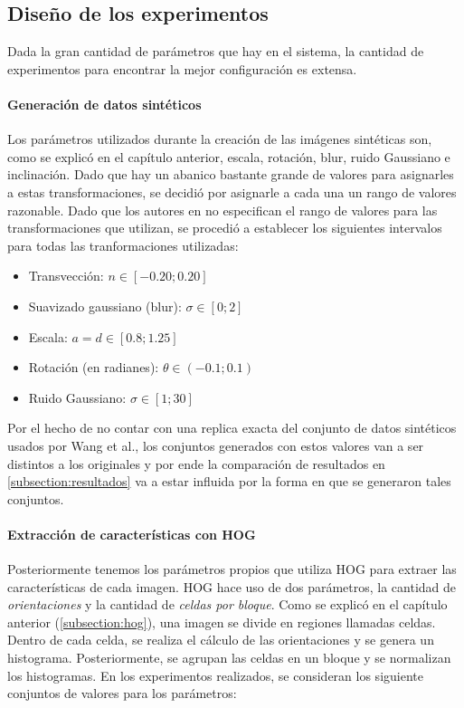 \subsection{Diseño de los experimentos}

	Dada la gran cantidad de parámetros que hay en el sistema, la cantidad de experimentos para encontrar la mejor configuración es extensa.

        \paragraph{Generación de datos sintéticos}

	Los parámetros utilizados durante la creación de las imágenes sintéticas son, como se explicó en el capítulo anterior, escala, rotación, blur, ruido Gaussiano e inclinación. Dado que hay un abanico bastante grande de valores para asignarles a estas transformaciones, se decidió por asignarle a cada una un rango de valores razonable. Dado que los autores en \cite{wang} no especifican el rango de valores para las transformaciones que utilizan, se procedió a establecer los siguientes intervalos para todas las tranformaciones utilizadas:
	
	\begin{itemize}
		\item Transvección: $n \in [-0.20 ; 0.20]$
		\item Suavizado gaussiano (blur): $\sigma \in [0 ; 2]$
		\item Escala: $a=d \in [0.8; 1.25]$
		\item Rotación (en radianes): $\theta \in (-0.1; 0.1)$
		\item Ruido Gaussiano: $\sigma \in [1; 30]$
	\end{itemize}
	
	Por el hecho de no contar con una replica exacta del conjunto de datos sintéticos usados por Wang et al., los conjuntos generados con estos valores van a ser distintos a los originales y por ende la comparación de resultados  en \ref{subsection:resultados} va a estar influida por la forma en que se generaron tales conjuntos.
	
	\paragraph{Extracción de características con HOG}

	Posteriormente tenemos los parámetros propios que utiliza HOG para extraer las características de cada imagen. HOG hace uso de dos parámetros, la cantidad de \textit{orientaciones} y la cantidad de \textit{celdas por bloque}. Como se explicó en el capítulo anterior (\ref{subsection:hog}), una imagen se divide en regiones llamadas celdas. Dentro de cada celda, se realiza el cálculo de las orientaciones y se genera un histograma. Posteriormente, se agrupan las celdas en un bloque y se normalizan los histogramas. En los experimentos realizados, se consideran los siguiente conjuntos de valores para los parámetros:
	
